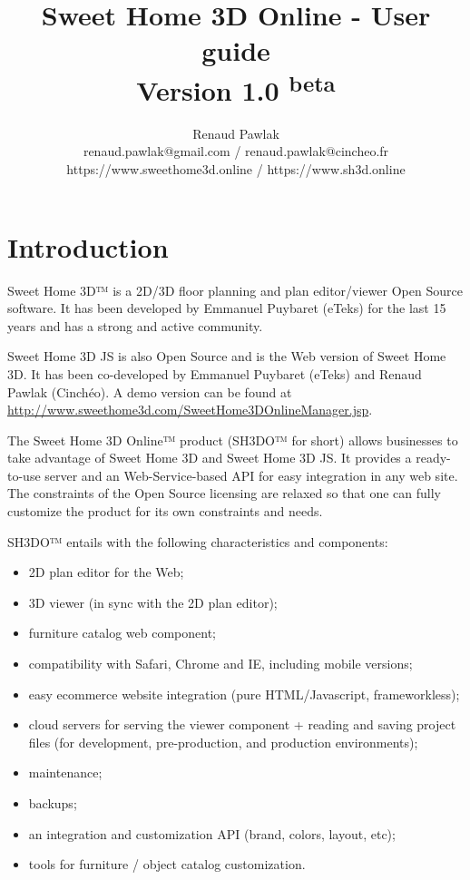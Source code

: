 \documentclass[a4paper]{report}
\begin{document}
\title{Sweet Home 3D Online - User guide\\{\large Version 1.0 \textsuperscript{beta}}}
\author{%
Renaud Pawlak\\
{\normalsize renaud.pawlak@gmail.com / renaud.pawlak@cincheo.fr}\\
{\normalsize https://www.sweethome3d.online / https://www.sh3d.online}\\
}%
\date{}
\maketitle

\tableofcontents

\chapter*{Introduction}

Sweet Home 3D™ is a 2D/3D floor planning and plan editor/viewer Open Source software. It has been developed by Emmanuel Puybaret (eTeks) for the last 15 years and has a strong and active community. 

Sweet Home 3D JS is also Open Source and is the Web version of Sweet Home 3D. It has been co-developed by Emmanuel Puybaret (eTeks) and Renaud Pawlak (Cinchéo). A demo version can be found at \url{http://www.sweethome3d.com/SweetHome3DOnlineManager.jsp}.

The Sweet Home 3D Online™ product (SH3DO™ for short) allows businesses to take advantage of Sweet Home 3D and Sweet Home 3D JS. It provides a ready-to-use server and an Web-Service-based API for easy integration in any web site. The constraints of the Open Source licensing are relaxed so that one can fully customize the product for its own constraints and needs. 

SH3DO™ entails with the following characteristics and components:

\begin{itemize}
\item 2D plan editor for the Web;
\item 3D viewer (in sync with the 2D plan editor);
\item furniture catalog web component;
\item compatibility with Safari, Chrome and IE, including mobile versions;
\item easy ecommerce website integration (pure HTML/Javascript, frameworkless);
\item cloud servers for serving the viewer component + reading and saving project files (for development, pre-production, and production environments);
\item maintenance;
\item backups;
\item an integration and customization API (brand, colors, layout, etc);
\item tools for furniture / object catalog customization.
\end{itemize}
\end{document}

